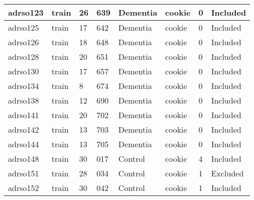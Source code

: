 \begin{center}
\begin{longtable}{|l|l|l|l|l|l|l|l|}
adrso123       & train                 & 26              & 639                & Dementia             & cookie          & 0                & Included      \\ \hline
adrso125       & train                 & 17              & 642                & Dementia             & cookie          & 0                & Included      \\ \hline
adrso126       & train                 & 18              & 648                & Dementia             & cookie          & 0                & Included      \\ \hline
adrso128       & train                 & 20              & 651                & Dementia             & cookie          & 0                & Included      \\ \hline
adrso130       & train                 & 17              & 657                & Dementia             & cookie          & 0                & Included      \\ \hline
adrso134       & train                 & 8               & 674                & Dementia             & cookie          & 0                & Included      \\ \hline
adrso138       & train                 & 12              & 690                & Dementia             & cookie          & 0                & Included      \\ \hline
adrso141       & train                 & 20              & 702                & Dementia             & cookie          & 0                & Included      \\ \hline
adrso142       & train                 & 13              & 703                & Dementia             & cookie          & 0                & Included      \\ \hline
adrso144       & train                 & 13              & 705                & Dementia             & cookie          & 0                & Included      \\ \hline
adrso148       & train                 & 30              & 017                & Control              & cookie          & 4                & Included      \\ \hline
adrso151       & train                 & 28              & 034                & Control              & cookie          & 1                & Excluded      \\ \hline
adrso152       & train                 & 30              & 042                & Control              & cookie          & 1                & Included      \\ \hline

\end{longtable}
\end{center}
